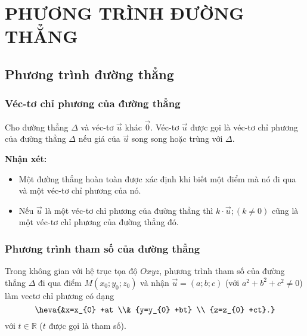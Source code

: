\section{PHƯƠNG TRÌNH ĐƯỜNG THẲNG}

\subsection{Phương trình đường thẳng}

\subsubsection{Véc-tơ chỉ phương của đường thẳng}
 Cho đường thẳng $\Delta $ và véc-tơ $\overrightarrow{u}$ khác $\overrightarrow{0}$. Véc-tơ $\overrightarrow{u}$ được gọi là véc-tơ chỉ phương của đường thẳng $\Delta $ nếu giá của $\overrightarrow{u}$ song song hoặc trùng với $\Delta $.
 \begin{center}
\end{center}
 \textbf{Nhận xét:}
\begin{itemize}
	\item  Một đường thẳng hoàn toàn được xác định khi biết một điểm mà nó đi qua và một véc-tơ chỉ phương của nó.
	\item  Nếu $\overrightarrow{u}$ là một véc-tơ chỉ phương của đường thẳng thì $k\cdot\overrightarrow{u}; (k\ne 0)$ cũng là một véc-tơ chỉ phương của đường thẳng đó.
\end{itemize}

\subsubsection{Phương trình tham số của đường thẳng}

 Trong không gian với hệ trục tọa độ $Oxyz$, phương trình tham số của đường thẳng $\Delta $ đi qua điểm $M(x_{0} ;y_{0} ;z_{0} )$ và nhận $\overrightarrow{u}=(a;b;c)$ (với $a^{2} +b^{2} +c^{2} \ne 0$) làm vectơ chỉ phương có dạng
 $$\heva{&x=x_{0} +at \\& {y=y_{0} +bt} \\ {z=z_{0} +ct}.} $$   với $t\in  \mathbb{R}$ ($t$ được gọi là tham số).
\begin{center}
\end{center}

